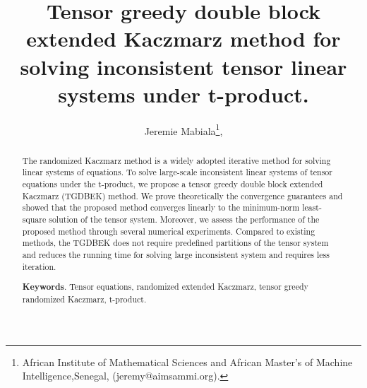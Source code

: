 \documentclass[11pt]{article}
\title{
Tensor greedy double block extended Kaczmarz method for solving inconsistent tensor linear systems under t-product.
}
\author{Jeremie Mabiala\thanks{African Institute of  Mathematical Sciences and African Master's of Machine Intelligence,Senegal, (jeremy@aimsammi.org).},%
}
\date{}
\begin{document}
\maketitle

\begin{abstract} 

The randomized Kaczmarz method is a widely adopted iterative method for solving  linear systems of equations. To solve large-scale inconsistent linear systems of tensor equations under the t-product, we propose a tensor greedy double block extended Kaczmarz (TGDBEK) method. We prove  theoretically the convergence guarantees and showed that the proposed method converges linearly to the minimum-norm least-square solution of the tensor system. Moreover, we assess the performance of the proposed method through several numerical experiments. Compared to existing methods, the TGDBEK does not require predefined partitions of the tensor system and reduces the running time for solving large inconsistent system and requires less iteration.

\vspace{.5mm} 

{\bf Keywords}. Tensor equations, randomized extended Kaczmarz, tensor greedy randomized Kaczmarz,  t-product.


\end{abstract}



\end{document}

